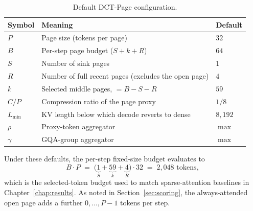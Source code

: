 \begin{table}[ht]
  \centering
  \caption[Default DCT-Page configuration used in this thesis.]
  {Default DCT-Page configuration.}
  \label{tab:config}
  \small
  \begin{tabular}{l l l}
    \toprule
    Symbol & Meaning & Default \\
    \midrule
    $P$            & Page size (tokens per page)                  & $32$ \\
    $B$            & Per-step page budget ($S + k + R$)           & $64$ \\
    $S$            & Number of sink pages                         & $1$ \\
    $R$            & Number of full recent pages
                     (excludes the open page)                     & $4$ \\
    $k$            & Selected middle pages, $= B - S - R$         & $59$ \\
    $C/P$          & Compression ratio of the page proxy          & $1/8$ \\
    $L_\text{min}$ & KV length below which decode reverts to dense
                                                                   & $8{,}192$ \\
    $\rho$         & Proxy-token aggregator                       & $\max$ \\
    $\gamma$       & GQA-group aggregator                         & $\max$ \\
    \bottomrule
  \end{tabular}
\end{table}

Under these defaults, the per-step fixed-size budget evaluates to
\begin{equation*}
  B \cdot P
  \;=\;
  \bigl(\underbrace{1}_{S} + \underbrace{59}_{k}
        + \underbrace{4}_{R}\bigr) \cdot 32
  \;=\; 2{,}048 \text{ tokens},
\end{equation*}
which is the selected-token budget used to match sparse-attention
baselines in Chapter~\ref{chap:results}.  As noted in
Section~\ref{sec:scoring}, the always-attended open page adds a
further $0,\dots,P{-}1$ tokens per step.
